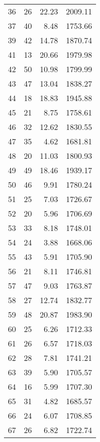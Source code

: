 \begin{appendix}
\begin{longtable}{rrrr}
36 & 26 & 22.23 & 2009.11 \\
37 & 40 & 8.48 & 1753.66 \\
39 & 42 & 14.78 & 1870.74 \\
41 & 13 & 20.66 & 1979.98 \\
42 & 50 & 10.98 & 1799.99 \\
43 & 47 & 13.04 & 1838.27 \\
44 & 18 & 18.83 & 1945.88 \\
45 & 21 & 8.75 & 1758.61 \\
46 & 32 & 12.62 & 1830.55 \\
47 & 35 & 4.62 & 1681.81 \\
48 & 20 & 11.03 & 1800.93 \\
49 & 49 & 18.46 & 1939.17 \\
50 & 46 & 9.91 & 1780.24 \\
51 & 25 & 7.03 & 1726.67 \\
52 & 20 & 5.96 & 1706.69 \\
53 & 33 & 8.18 & 1748.01 \\
54 & 24 & 3.88 & 1668.06 \\
55 & 43 & 5.91 & 1705.90 \\
56 & 21 & 8.11 & 1746.81 \\
57 & 47 & 9.03 & 1763.87 \\
58 & 27 & 12.74 & 1832.77 \\
59 & 48 & 20.87 & 1983.90 \\
60 & 25 & 6.26 & 1712.33 \\
61 & 26 & 6.57 & 1718.03 \\
62 & 28 & 7.81 & 1741.21 \\
63 & 39 & 5.90 & 1705.57 \\
64 & 16 & 5.99 & 1707.30 \\
65 & 31 & 4.82 & 1685.57 \\
66 & 24 & 6.07 & 1708.85 \\
67 & 26 & 6.82 & 1722.74 \\
\bottomrule
\end{longtable}


\end{appendix}
